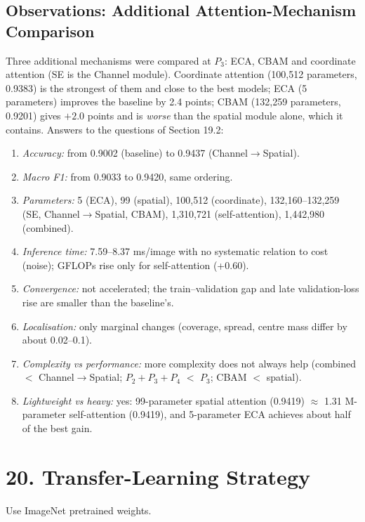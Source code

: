 \documentclass[10pt]{article}
\begin{document}
\subsection*{Observations: Additional Attention-Mechanism Comparison}
Three additional mechanisms were compared at $P_3$: ECA, CBAM and coordinate attention (SE is the Channel module). Coordinate attention (100{,}512 parameters, 0.9383) is the strongest of them and close to the best models; ECA (5 parameters) improves the baseline by 2.4 points; CBAM (132{,}259 parameters, 0.9201) gives $+2.0$ points and is \emph{worse} than the spatial module alone, which it contains. Answers to the questions of Section 19.2:
\begin{enumerate}
\item \emph{Accuracy:} from 0.9002 (baseline) to 0.9437 (Channel$\to$Spatial).
\item \emph{Macro F1:} from 0.9033 to 0.9420, same ordering.
\item \emph{Parameters:} 5 (ECA), 99 (spatial), 100{,}512 (coordinate), 132{,}160--132{,}259 (SE, Channel$\to$Spatial, CBAM), 1{,}310{,}721 (self-attention), 1{,}442{,}980 (combined).
\item \emph{Inference time:} 7.59--8.37 ms/image with no systematic relation to cost (noise); GFLOPs rise only for self-attention (+0.60).
\item \emph{Convergence:} not accelerated; the train--validation gap and late validation-loss rise are smaller than the baseline's.
\item \emph{Localisation:} only marginal changes (coverage, spread, centre mass differ by about 0.02--0.1).
\item \emph{Complexity vs performance:} more complexity does not always help (combined $<$ Channel$\to$Spatial; $P_2{+}P_3{+}P_4$ $<$ $P_3$; CBAM $<$ spatial).
\item \emph{Lightweight vs heavy:} yes: 99-parameter spatial attention (0.9419) $\approx$ 1.31 M-parameter self-attention (0.9419), and 5-parameter ECA achieves about half of the best gain.
\end{enumerate}


\section*{20. Transfer-Learning Strategy}

Use ImageNet pretrained weights.
\end{document}
